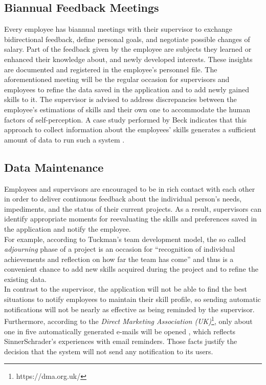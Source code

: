 \subsection{Biannual Feedback Meetings}
Every employee has biannual meetings with their supervisor to exchange
bidirectional feedback, define personal goals, and negotiate possible changes of salary.
Part of the feedback given by the employee are subjects they learned or enhanced their knowledge about, and newly developed interests. These insights are documented and registered in the employee's personnel file.
The aforementioned meeting will be the regular occasion for supervisors and employees to refine the data saved in the application and to add
newly gained skills to it. The supervisor is advised to address discrepancies between the employee's estimations of skills and their own one to accommodate the human factors of self-perception. A case study performed by Beck indicates that this approach to
collect information about the employees' skills generates a sufficient amount of data to run such a system \cite{beck}.

\subsection{Data Maintenance}
Employees and supervisors are encouraged to be in rich contact with each other in order to deliver continuous feedback
about the individual person's needs, impediments, and the status of their current projects.
As a result, supervisors can identify appropriate moments for reevaluating the skills and preferences saved in the application and notify the employee.\\
For example, according to Tuckman's team development model, the so called \textit{adjourning} phase of a project is an occasion for ``recognition of individual achievements and reflection on how far the team has come'' \cite[P. 3]{Wilson} and thus is a convenient chance to add new skills acquired during the project and to refine the existing data.\\
In contrast to the supervisor, the application will not be able to find the best situations to notify employees to maintain their skill profile, so sending automatic notifications will not be nearly as effective as being reminded by the supervisor. Furthermore, according to the \textit{Direct Marketing Association (UK)}\footnote{https://dma.org.uk/}, only
about one in five automatically generated e-mails will be opened \cite{mailrep}, which reflects SinnerSchrader's
experiences with email reminders. Those facts justify the decision that the system will not send any notification to its users.

